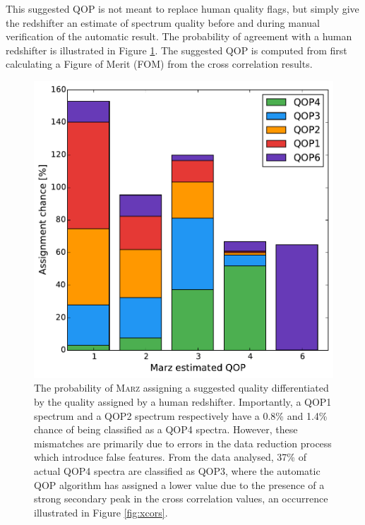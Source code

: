 \documentclass[iop]{emulateapj}
\newcommand{\marz}{\textsc{Marz}}
\begin{document}
This suggested QOP is not meant to replace human quality flags, but simply give the redshifter an estimate of spectrum quality before and during manual verification of the automatic result. The probability of agreement with a human redshifter is illustrated in Figure \ref{fig:autoqop}. The suggested QOP is computed from first calculating a Figure of Merit (FOM) from the cross correlation results.

\begin{figure}[h]
\centering
\includegraphics[width=\columnwidth]{autoqop.pdf}
\caption{The probability of \marz{} assigning a suggested quality differentiated by the quality assigned by a human redshifter. Importantly, a QOP1 spectrum and a QOP2 spectrum respectively have a 0.8\%  and 1.4\% chance of being classified as a QOP4 spectra. However, these mismatches are primarily due to errors in the data reduction process which introduce false features. From the data analysed, 37\% of actual QOP4 spectra are classified as QOP3, where the automatic QOP algorithm has assigned a lower value due to the presence of a strong secondary peak in the cross correlation values, an occurrence illustrated in Figure \ref{fig:xcors}.}
\label{fig:autoqop}
\end{figure}
\end{document}
